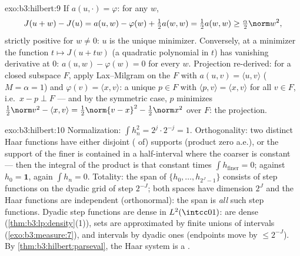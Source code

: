 \begin{solution}{exo:b3:hilbert:9}
If $a(u, \cdot) = \varphi$: for any $w$,
\[
J(u + w) - J(u) = a(u, w) - \varphi(w) + \tfrac12a(w,w)
= \tfrac12a(w,w) \geq \tfrac\alpha2\norm w^2,
\]
strictly positive for $w \neq 0$: $u$ is the unique minimizer.
Conversely, at a minimizer the function $t \mapsto J(u + tw)$
(a quadratic polynomial in $t$) has vanishing derivative at
$0$: $a(u, w) - \varphi(w) = 0$ for every $w$. Projection
re-derived: for a closed subspace $F$, apply Lax--Milgram on
the  $F$ with $a(u,v) = \langle u, v\rangle$
($M = \alpha = 1$) and $\varphi(v) = \langle x, v\rangle$: a
unique $p \in F$ with $\langle p, v\rangle = \langle x,
v\rangle$ for all $v \in F$, i.e.\ $x - p \perp F$ --- and by
the symmetric case, $p$ minimizes $\frac12\norm v^2 - \langle
x, v\rangle = \frac12\norm{v - x}^2 - \frac12\norm x^2$ over
$F$: the projection.
\end{solution}

\begin{solution}{exo:b3:hilbert:10}
Normalization: $\int h_n^2 = 2^j\cdot 2^{-j} = 1$.
Orthogonality: two distinct Haar functions have either
disjoint ( of) supports (product zero a.e.), or the
support of the finer is contained in a half-interval where the
coarser is constant --- then the integral of the product is
that constant times $\int h_{\text{finer}} = 0$; against $h_0
= \mathbf 1$, again $\int h_n = 0$. Totality: the span of
$\{h_0, \dots, h_{2^J-1}\}$ consists of step functions on the
dyadic grid of step $2^{-J}$; both spaces have dimension
$2^J$ and the Haar functions are independent (orthonormal):
the span is \emph{all} such step functions. Dyadic step
functions are dense in $L^2(\intcc01)$:  are
dense (\cref{thm:b3:lp:density}(1)),  sets are
approximated by finite unions of intervals
(\cref{exo:b3:measure:7}), and intervals by dyadic ones
(endpoints move by $\leq 2^{-J}$). By
\cref{thm:b3:hilbert:parseval}, the Haar system is a .
\end{solution}

